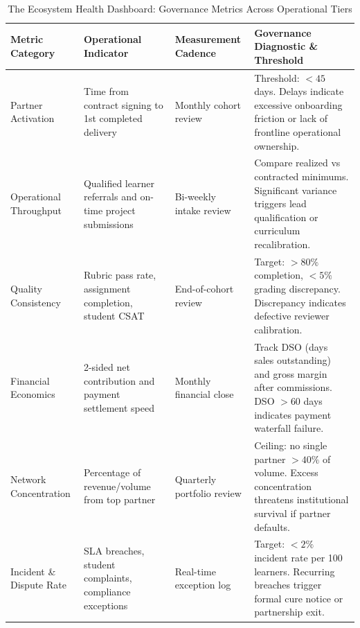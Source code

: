 \begin{table}[t]
\centering
\small
\caption{The Ecosystem Health Dashboard: Governance Metrics Across Operational Tiers}
\label{tab:ecosystem_health_dashboard}
\begin{tabularx}{\textwidth}{p{2.8cm} p{3.2cm} p{3.4cm} X}
\toprule
\textbf{Metric Category} & \textbf{Operational Indicator} & \textbf{Measurement Cadence} & \textbf{Governance Diagnostic \& Threshold} \\
\midrule
Partner Activation & Time from contract signing to 1st completed delivery & Monthly cohort review & Threshold: $<45$ days. Delays indicate excessive onboarding friction or lack of frontline operational ownership. \\
Operational Throughput & Qualified learner referrals and on-time project submissions & Bi-weekly intake review & Compare realized vs contracted minimums. Significant variance triggers lead qualification or curriculum recalibration. \\
Quality Consistency & Rubric pass rate, assignment completion, student CSAT & End-of-cohort review & Target: $>80\%$ completion, $<5\%$ grading discrepancy. Discrepancy indicates defective reviewer calibration. \\
Financial Economics & 2-sided net contribution and payment settlement speed & Monthly financial close & Track DSO (days sales outstanding) and gross margin after commissions. DSO $>60$ days indicates payment waterfall failure. \\
Network Concentration & Percentage of revenue/volume from top partner & Quarterly portfolio review & Ceiling: no single partner $>40\%$ of volume. Excess concentration threatens institutional survival if partner defaults. \\
Incident \& Dispute Rate & SLA breaches, student complaints, compliance exceptions & Real-time exception log & Target: $<2\%$ incident rate per 100 learners. Recurring breaches trigger formal cure notice or partnership exit. \\
\bottomrule
\end{tabularx}
\end{table}
